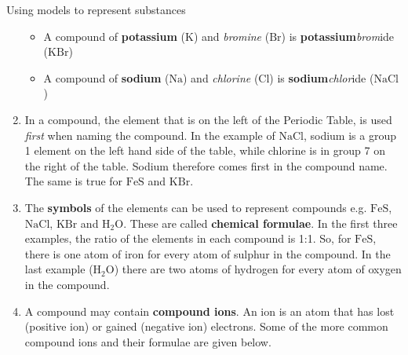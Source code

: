 \begin{activity}{Using models to represent substances}
\begin{enumerate}[noitemsep, label=\textbf{\arabic*}. ]
\begin{itemize}[noitemsep]
\label{m38708*uid37}\item A compound of \textbf{potassium} ($\mathrm{K}$) and \textsl{bromine} ($\mathrm{Br}$) is \textbf{potassium}\hspace{1ex}\textsl{brom}ide ($\mathrm{KBr}$)
\label{m38708*uid38}\item A compound of \textbf{sodium} ($\mathrm{Na}$) and \textsl{chlorine} ($\mathrm{Cl}$) is \textbf{sodium}\hspace{1ex}\textsl{chlor}ide ($\mathrm{NaCl}$)
\end{itemize}
        \label{m38708*uid39}\item In a compound, the element that is on the left of the Periodic Table, is used \textsl{first} when naming the compound. In the example of $\mathrm{NaCl}$, sodium is a group 1 element on the left hand side of the table, while chlorine is in group 7 on the right of the table. Sodium therefore comes first in the compound name. The same is true for $\mathrm{FeS}$ and $\mathrm{KBr}$.
\label{m38708*uid40}\item The \textbf{symbols} of the elements can be used to represent compounds e.g. $\mathrm{FeS}$, $\mathrm{NaCl}$, $\mathrm{KBr}$ and $\mathrm{H}{}_{2}\mathrm{O}$. These are called \textbf{chemical formulae}. In the first three examples, the ratio of the elements in each compound is 1:1. So, for $\mathrm{FeS}$, there is one atom of iron for every atom of sulphur in the compound. In the last example ($\mathrm{H}{}_{2}\mathrm{O}$) there are two atoms of hydrogen for every atom of oxygen in the compound.
\label{m38708*uid41}\item A compound may contain \textbf{compound ions}. An ion is an atom that has lost (positive ion) or gained (negative ion) electrons. Some of the more common compound ions and their formulae are given below.\\

      \label{m38708*id64235}
\begin{table}
\begin{center}


\end{center}
\end{table}
\end{enumerate}
\end{activity}
